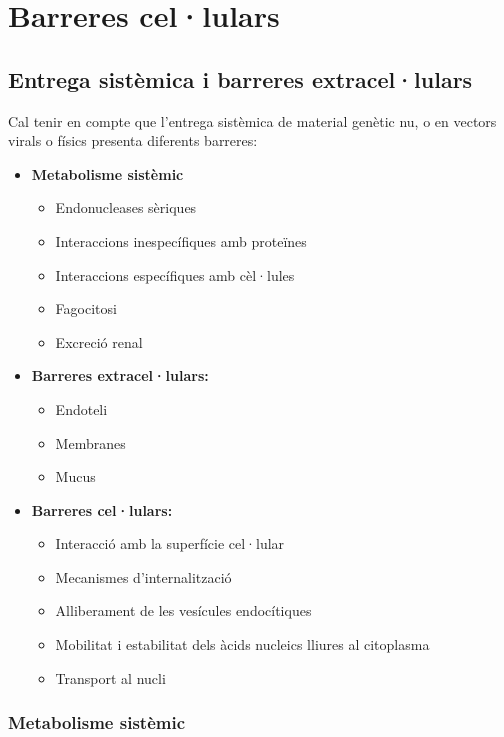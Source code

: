 \section{Barreres cel·lulars}
\label{sec:barreres-cel.lulars}

\subsection{Entrega sistèmica i barreres extracel·lulars}
\label{sec:entrega-sistemica-i}
Cal tenir en compte que l'entrega sistèmica de material genètic nu, o en vectors virals o físics presenta diferents barreres:
\begin{itemize}
\item \textbf{Metabolisme sistèmic}
  \begin{itemize}
  \item Endonucleases sèriques
  \item Interaccions inespecífiques amb proteïnes
  \item Interaccions específiques amb cèl·lules
  \item Fagocitosi
  \item Excreció renal
  \end{itemize}
\item \textbf{Barreres extracel·lulars:}
  \begin{itemize}
  \item Endoteli
  \item Membranes
  \item Mucus
  \end{itemize}
\item \textbf{Barreres cel·lulars:}
  \begin{itemize}
  \item Interacció amb la superfície cel·lular
  \item Mecanismes d'internalització
  \item Alliberament de les vesícules endocítiques
  \item Mobilitat i estabilitat dels àcids nucleics lliures al citoplasma
  \item Transport al nucli
  \end{itemize}
\end{itemize}

\subsubsection{Metabolisme sistèmic}
\label{sec:metabolisme-sistemic}

